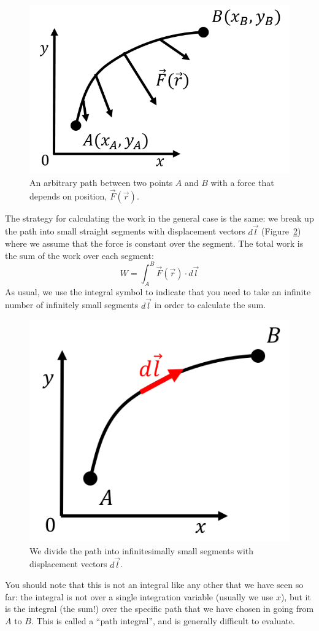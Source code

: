 \begin{figure}[!htbp]
\centering
\includegraphics[width=0.5\linewidth]{files/workgeneral-84453b5d1021cea1e90c769f48cf81a0.png}
\caption[]{An arbitrary path between two points $A$ and $B$ with a force that depends on position, $\vec F(\vec r)$.}
\label{fig:workenergy:workgeneral}
\end{figure}

The strategy for calculating the work in the general case is the same: we break up the path into small straight segments with displacement vectors $d\vec l$ (Figure~\ref{fig:workenergy:dldiagram}) where we assume that the force is constant over the segment. The total work is the sum of the work over each segment:
\begin{equation}
\boxed{W = \int_A^B \vec F(\vec r) \cdot d\vec l}
\end{equation}
As usual, we use the integral symbol to indicate that you need to take an infinite number of infinitely small segments $d\vec l$ in order to calculate the sum.

\begin{figure}[!htbp]
\centering
\includegraphics[width=0.3\linewidth]{files/elementoflengthdl-6ada5f90333a0876a91e3ab41ee39190.png}
\caption[]{We divide the path into infinitesimally small segments with displacement vectors $d\vec l$.}
\label{fig:workenergy:dldiagram}
\end{figure}

You should note that this is not an integral like any other that we have seen so far: the integral is not over a single integration variable (usually we use $x$), but it is the integral (the sum!) over the specific path that we have chosen in going from $A$ to $B$. This is called a ``path integral'', and is generally difficult to evaluate.

